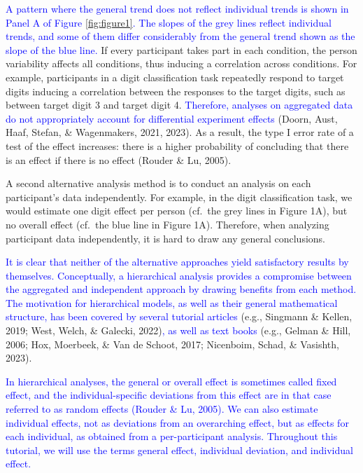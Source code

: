 \documentclass[
  english,
  doc,floatsintext]{apa6}
\begin{document}
\textcolor{blue}{A pattern where the general trend does not reflect individual trends is shown in Panel A of Figure} \ref{fig:figure1}\textcolor{blue}{. The slopes of the grey lines reflect individual trends, and some of them differ considerably from the general trend shown as the slope of the blue line.} If every participant takes part in each condition, the person variability affects all conditions, thus inducing a correlation across conditions. For example, participants in a digit classification task repeatedly respond to target digits inducing a correlation between the responses to the target digits, such as between target digit 3 and target digit 4. \textcolor{blue}{Therefore, analyses on aggregated data do not appropriately account for differential experiment effects} (Doorn, Aust, Haaf, Stefan, \& Wagenmakers, 2021, 2023). As a result, the type I error rate of a test of the effect increases: there is a higher probability of concluding that there is an effect if there is no effect (Rouder \& Lu, 2005).

A second alternative analysis method is to conduct an analysis on each participant's data independently. For example, in the digit classification task, we would estimate one digit effect per person (cf.~the grey lines in Figure 1A), but no overall effect (cf.~the blue line in Figure 1A). Therefore, when analyzing participant data independently, it is hard to draw any general conclusions.

\textcolor{blue}{It is clear that neither of the alternative approaches yield satisfactory results by themselves. Conceptually, a hierarchical analysis provides a compromise between the aggregated and independent approach by drawing benefits from each method. The motivation for hierarchical models, as well as their general mathematical structure, has been covered by several tutorial articles} (e.g., Singmann \& Kellen, 2019; West, Welch, \& Galecki, 2022)\textcolor{blue}{, as well as text books} (e.g., Gelman \& Hill, 2006; Hox, Moerbeek, \& Van de Schoot, 2017; Nicenboim, Schad, \& Vasishth, 2023).

\textcolor{blue}{In hierarchical analyses, the general or overall effect is sometimes called fixed effect, and the individual-specific deviations from this effect are in that case referred to as random effects (Rouder \& Lu, 2005). We can also estimate individual effects, not as deviations from an overarching effect, but as effects for each individual, as obtained from a per-participant analysis. Throughout this tutorial, we will use the terms general effect, individual deviation, and individual effect.}
\end{document}
